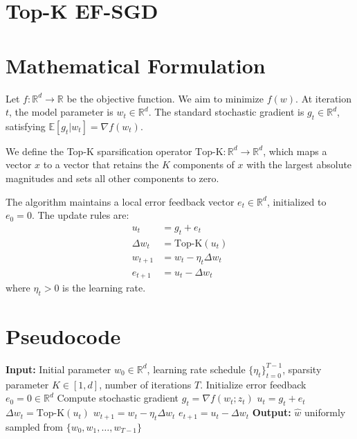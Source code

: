\documentclass{article}
\newcommand{\E}{\mathbb{E}}
\newcommand{\R}{\mathbb{R}}
\begin{document}
\section*{Top-K EF-SGD}

\section*{Mathematical Formulation}
Let $f: \R^d \to \R$ be the objective function. We aim to minimize $f(w)$. At iteration $t$, the model parameter is $w_t \in \R^d$. The standard stochastic gradient is $g_t \in \R^d$, satisfying $\E[g_t | w_t] = \nabla f(w_t)$. 

We define the Top-K sparsification operator $\text{Top-K}: \R^d \to \R^d$, which maps a vector $x$ to a vector that retains the $K$ components of $x$ with the largest absolute magnitudes and sets all other components to zero.

The algorithm maintains a local error feedback vector $e_t \in \R^d$, initialized to $e_0 = 0$. The update rules are:
\begin{align}
    u_t &= g_t + e_t \\
    \Delta w_t &= \text{Top-K}(u_t) \\
    w_{t+1} &= w_t - \eta_t \Delta w_t \\
    e_{t+1} &= u_t - \Delta w_t
\end{align}
where $\eta_t > 0$ is the learning rate.

\section*{Pseudocode}
\begin{algorithm}[H]
\caption{Top-K EF-SGD}
\begin{algorithmic}[1]
\State \textbf{Input:} Initial parameter $w_0 \in \R^d$, learning rate schedule $\{\eta_t\}_{t=0}^{T-1}$, sparsity parameter $K \in [1, d]$, number of iterations $T$.
\State Initialize error feedback $e_0 = 0 \in \R^d$
    \State Compute stochastic gradient $g_t = \nabla f(w_t; z_t)$
    \State $u_t = g_t + e_t$
    \State $\Delta w_t = \text{Top-K}(u_t)$ 
    \State $w_{t+1} = w_t - \eta_t \Delta w_t$
    \State $e_{t+1} = u_t - \Delta w_t$ 
\EndFor
\State \textbf{Output:} $\hat{w}$ uniformly sampled from $\{w_0, w_1, \dots, w_{T-1}\}$
\end{algorithmic}
\end{algorithm}
\end{document}
